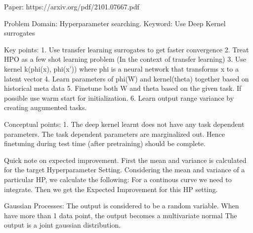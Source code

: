 \documentclass[12pt, twoside, ngerman]{report}
\begin{document}

\iffalse
Paper: https://arxiv.org/pdf/2101.07667.pdf

Problem Domain: Hyperparameter searching.
Keyword: Use Deep Kernel surrogates

Key points:
    1. Use transfer learning surrogates to get faster convergence
    2. Treat HPO as a few shot learning problem (In the context of transfer learning)
    3. Use kernel k(phi(x), phi(x')) where phi is a neural network that transforms x to a latent vector
    4. Learn parameters of phi(W) and kernel(theta) together based on historical meta data
    5. Finetune both W and theta based on the given task. If possible use warm start for initialization.
    6. Learn output range variance by creating augumented tasks.

Conceptual points:
    1. The deep kernel learnt does not have any task dependent parameters.
       The task dependent parameters are marginalized out.
       Hence finetuning during test time (after pretraining) should be complete.

Quick note on expected improvement.
    First the mean and variance is calculated for the target Hyperparameter Setting.
    Considering the mean and variance of a particular HP, we calculate the following:
        For a continous curve we need to integrate.
    Then we get the Expected Improvement for this HP setting.


Gaussian Processes:
    The output is considered to be a random variable.
    When have more than 1 data point, the output becomes a multivariate normal
        The output is a joint gaussian distribution.
\end{document}
